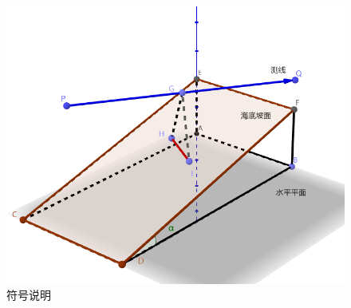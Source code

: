 \begin{figure}[h]
    \centering
    \includegraphics[scale=0.4]{res/img/符号说明.png}
    \caption{符号说明}
    \label{fig:符号说明}
\end{figure}



\begin{table}[h]
    \centering

    \renewcommand\arraystretch{1.5}
    
\end{table}
